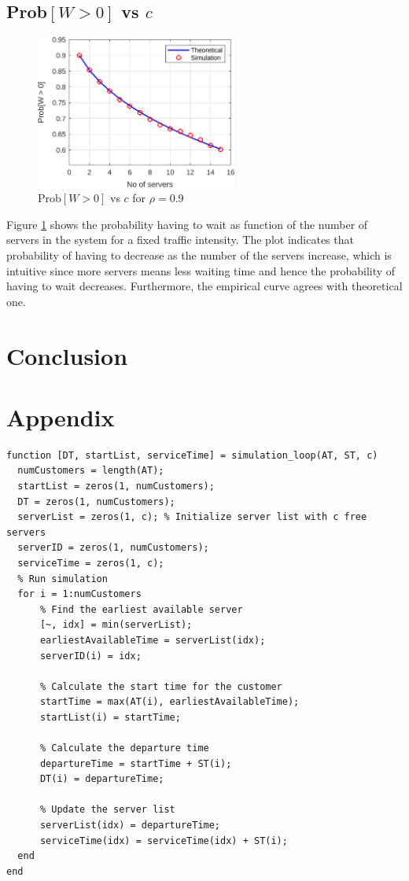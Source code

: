 \documentclass[12pt, a4paper]{article}
\begin{document}
\subsection{Prob$[W > 0]$ vs $c$}
\begin{figure}
  \centering 
  \includegraphics[width=250px]{../code/figures/pWaiting_vs_c/no_customers_1000000_max_c_15.png}
  \caption{Prob$[W > 0]$ vs $c$ for $\rho=0.9$}
  \label{W_vs_c}
\end{figure}

Figure \ref{W_vs_c} shows the probability having to wait as function of the number of servers 
in the system for a fixed traffic intensity. The plot indicates that probability of having to 
decrease as the number of the servers increase, which is intuitive since more servers means 
less waiting time and hence the probability of having to wait decreases. Furthermore, the 
empirical curve agrees with theoretical one.

\section{Conclusion}


\newpage
\section*{Appendix}
\footnotesize
\begin{lstlisting}[style=Matlab-editor, basicstyle=\ttfamily\footnotesize]
  function [DT, startList, serviceTime] = simulation_loop(AT, ST, c)
  numCustomers = length(AT);
  startList = zeros(1, numCustomers);
  DT = zeros(1, numCustomers);
  serverList = zeros(1, c); % Initialize server list with c free servers
  serverID = zeros(1, numCustomers);
  serviceTime = zeros(1, c);
  % Run simulation
  for i = 1:numCustomers
      % Find the earliest available server
      [~, idx] = min(serverList);
      earliestAvailableTime = serverList(idx);
      serverID(i) = idx;
      
      % Calculate the start time for the customer
      startTime = max(AT(i), earliestAvailableTime);
      startList(i) = startTime;
      
      % Calculate the departure time
      departureTime = startTime + ST(i);
      DT(i) = departureTime;
      
      % Update the server list
      serverList(idx) = departureTime;
      serviceTime(idx) = serviceTime(idx) + ST(i); 
  end
end
\end{lstlisting}
\end{document}
